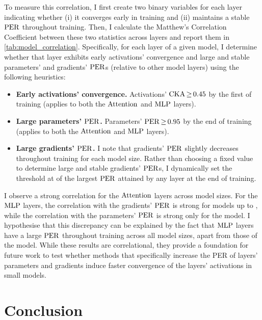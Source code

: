 To measure this correlation, I first create two binary variables for each layer indicating whether (i) it converges early in training and (ii) maintains a stable $\mathrm{PER}$ throughout training. Then, I calculate the Matthew's Correlation Coefficient between these two statistics across layers and report them in \cref{tab:model_correlation}.
Specifically, for each layer of a given model, I determine whether that layer exhibits early activations' convergence and large and stable parameters' and gradients' $\mathrm{PER}$s (relative to other model layers) using the following heuristics: 
\begin{itemize}
    \item \textbf{Early activations' convergence.} Activations' $\cka \mathop{\geq} \float[2]{0.45}$ by the first  of training (applies to both the $\mathrm{Attention}$ and $\mathrm{MLP}$ layers).
    
    \item \textbf{Large parameters' $\mathrm{PER}$.} Parameters' $\per \mathop{\geq} \float[2]{0.95}$ by the end of training (applies to both the $\mathrm{Attention}$ and $\mathrm{MLP}$ layers).
    
    \item \textbf{Large gradients' $\mathrm{PER}$.} I note that gradients' $\mathrm{PER}$ slightly decreases throughout training for each model size. Rather than choosing a fixed value to determine large and stable gradients' $\mathrm{PER}$s, I dynamically set the threshold at  of the largest $\mathrm{PER}$ attained by any layer at the end of training.
\end{itemize}
I observe a strong correlation for the $\mathrm{Attention}$ layers across model sizes. For the $\mathrm{MLP}$ layers, the correlation with the gradients' $\mathrm{PER}$ is strong for models up to \onebil, while the correlation with the parameters' $\mathrm{PER}$ is strong only for the \sevenmil model. I hypothesise that this discrepancy can be explained by the fact that $\mathrm{MLP}$ layers have a large $\mathrm{PER}$ throughout training across all model sizes, apart from those of the \sevenmil model. While these results are correlational, they provide a foundation for future work to test whether methods that specifically increase the PER of layers' parameters and gradients induce faster convergence of the layers' activations in small models.



\section{Conclusion}

